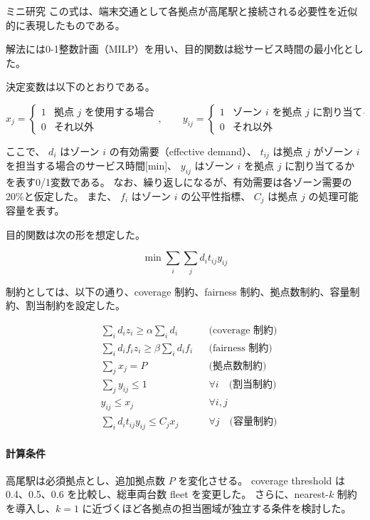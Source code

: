 \begin{column}{ミニ研究}
この式は、端末交通として各拠点が高尾駅と接続される必要性を近似的に表現したものである。

解法には0-1整数計画（MILP）を用い、目的関数は総サービス時間の最小化とした。

決定変数は以下のとおりである。

\[
x_j = 
\begin{cases}
1 & \text{拠点 } j \text{ を使用する場合} \\
0 & \text{それ以外}
\end{cases}, \qquad
y_{ij} =
\begin{cases}
1 & \text{ゾーン } i \text{ を拠点 } j \text{ に割り当てる場合} \\
0 & \text{それ以外}
\end{cases}
\]

ここで、
$d_i$ はゾーン $i$ の有効需要（effective demand）、
$t_{ij}$ は拠点 $j$ がゾーン $i$ を担当する場合のサービス時間[min]、
$y_{ij}$ はゾーン $i$ を拠点 $j$ に割り当てるかを表す0/1変数である。
なお、繰り返しになるが、有効需要は各ゾーン需要の20\%と仮定した。
また、
$f_i$ はゾーン $i$ の公平性指標、
$C_j$ は拠点 $j$ の処理可能容量を表す。

目的関数は次の形を想定した。

\[
\min \sum_i \sum_j d_i t_{ij} y_{ij}
\]


制約としては、以下の通り、coverage 制約、fairness 制約、拠点数制約、容量制約、割当制約を設定した。

\begin{align*}
&\sum_i d_i z_i \ge \alpha \sum_i d_i
&& \text{(coverage 制約)} \\
&\sum_i d_i f_i z_i \ge \beta \sum_i d_i f_i
&& \text{(fairness 制約)} \\
&\sum_j x_j = P
&& \text{(拠点数制約)} \\
&\sum_j y_{ij} \le 1
&& \forall i \quad \text{(割当制約)} \\
&y_{ij} \le x_j
&& \forall i,j \\
&\sum_i d_i t_{ij} y_{ij}
\le
C_j x_j
&& \forall j \quad \text{(容量制約)}
\end{align*}

\paragraph{計算条件}
高尾駅は必須拠点とし、追加拠点数 $P$ を変化させる。
coverage threshold は 0.4、0.5、0.6 を比較し、総車両台数 fleet を変更した。
さらに、nearest-$k$ 制約を導入し、$k=1$ に近づくほど各拠点の担当圏域が独立する条件を検討した。


\end{column}

